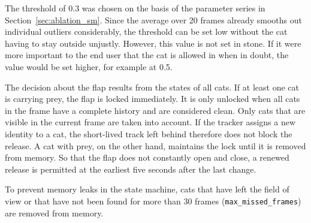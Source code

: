 The threshold of 0.3 was chosen on the basis of the parameter series in Section~\ref{sec:ablation_sm}. Since the average over 20 frames already smooths out individual outliers considerably, the threshold can be set low without the cat having to stay outside unjustly. However, this value is not set in stone. If it were more important to the end user that the cat is allowed in when in doubt, the value would be set higher, for example at 0.5.

The decision about the flap results from the states of all cats. If at least one cat is carrying prey, the flap is locked immediately. It is only unlocked when all cats in the frame have a complete history and are considered clean. Only cats that are visible in the current frame are taken into account. If the tracker assigns a new identity to a cat, the short-lived track left behind therefore does not block the release. A cat with prey, on the other hand, maintains the lock until it is removed from memory. So that the flap does not constantly open and close, a renewed release is permitted at the earliest five seconds after the last change.

To prevent memory leaks in the state machine, cats that have left the field of view or that have not been found for more than 30 frames (\texttt{max\_missed\_frames}) are removed from memory.

